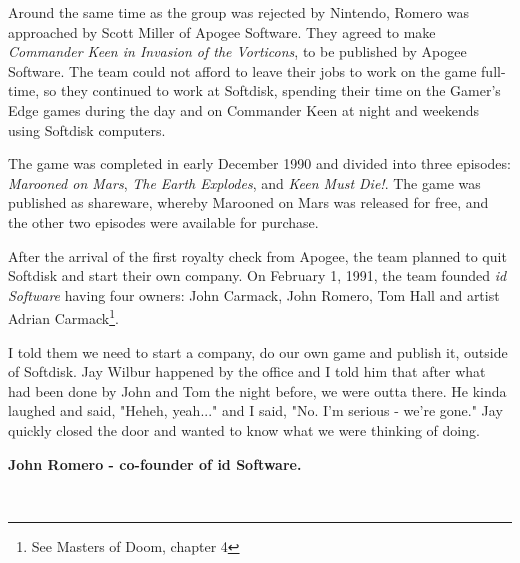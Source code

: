 \documentclass[book.tex]{subfiles}
\begin{document}
\label{sec:id_software}
Around the same time as the group was rejected by Nintendo, Romero was approached by Scott Miller of Apogee Software. They agreed to make \textit{Commander Keen in Invasion of the Vorticons}, to be published by Apogee Software. The team could not afford to leave their jobs to work on the game full-time, so they continued to work at Softdisk, spending their time on the Gamer's Edge games during the day and on Commander Keen at night and weekends using Softdisk computers.\\

\par
The game was completed in early December 1990 and divided into three episodes: \textit{Marooned on Mars}, \textit{The Earth Explodes}, and \textit{Keen Must Die!}. The game was published as shareware, whereby Marooned on Mars was released for free, and the other two episodes were available for purchase.\\

\par
After the arrival of the first royalty check from Apogee, the team planned to quit Softdisk and start their own company. On February 1, 1991, the team founded \textit{id Software} having four owners: John Carmack, John Romero, Tom Hall and artist Adrian Carmack\footnote{See Masters of Doom, chapter 4}. \\

\par
\begin{fancyquotes}
I told them we need to start a company, do our own game and publish it, outside of Softdisk. Jay Wilbur happened by the office and I told him that after what had been done by John and Tom the night before, we were outta there. He kinda laughed and said, "Heheh, yeah..." and I said, "No. I'm serious - we're gone." Jay quickly closed the door and wanted to know what we were thinking of doing.\\
\par
\textbf{John Romero - co-founder of id Software.}
\end{fancyquotes}\\
\end{document}
